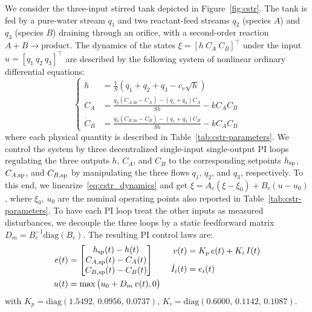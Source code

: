 \documentclass[11pt, a4paper]{article}
\theoremstyle{remark}
\theoremstyle{plain}
\begin{document}
We consider the three-input stirred tank depicted in Figure~\ref{fig:cstr}. The tank is fed by a pure-water stream $q_1$ and two reactant-feed streams $q_2$ (species $A$) and $q_3$ (species $B$) draining through 
an orifice, with a second-order reaction $A+B\to\text{product}$. 
The dynamics of the states $\xi=[h\ C_A\ C_B]^\top$ 
under the input $u=[q_1\ q_2\ q_3]^\top$ are described by the following system of nonlinear 
ordinary differential equations:
\begin{equation}
\left\{
\begin{aligned}
\dot h &= \frac{1}{S}(q_1 + q_2 + q_3 - c_v\sqrt{h}) \\
\dot C_A &= \frac{q_2(C_{A,\mathrm{in}}-C_A) - (q_1+q_3)C_A}{S h} - k C_A C_B \\
\dot C_B &= \frac{q_3(C_{B,\mathrm{in}}-C_B) - (q_1+q_2)C_B}{S h} - k C_A C_B 
\end{aligned}
\right.
\label{eq:cstr_dynamics}%
\end{equation}
where each physical quantity is described in Table~\ref{tab:cstr-parameters}. We control the system by three decentralized single-input single-output PI loops regulating the three outputs $h$, $C_A$, and $C_B$ to the corresponding setpoints $h_{\rm sp}$, $C_{A,\rm sp}$, and $C_{B,\rm sp}$ by manipulating the three flows $q_1$, $q_2$, and $q_3$,
respectively. To this end, we linearize~\eqref{eq:cstr_dynamics} and get $\dot\xi = A_c (\xi-\xi_0) + B_c (u-u_0)$, where $\xi_0$, $u_0$ are the nominal operating points also reported in Table~\ref{tab:cstr-parameters}. To have each PI loop treat the other inputs as measured disturbances, we decouple the three loops by a static feedforward matrix $D_m = B_c^{-1}\mathrm{diag}(B_c)$. The resulting PI control laws are:
\begin{subequations}
\begin{align}
e(t) &= \begin{bmatrix} h_{\rm sp}(t)-h(t)\\ C_{A,\rm sp}(t)-C_A(t)\\ C_{B,\rm sp}(t)-C_B(t)\end{bmatrix} \qquad
\begin{aligned}
v(t) &= K_p\,e(t) + K_i\,I(t)\\[.5em]
\dot I_i(t)&=e_i(t) \label{eq:pi-law}
\end{aligned}\\
u(t) &= \max\big(u_0 + D_m\,v(t), 0\big) \label{eq:pi-decoupling}
\end{align}%
\label{eq:pi-controller}%
\end{subequations}
with $K_p=\mathrm{diag}(1.5492,\,0.0956,\,0.0737)$, $K_i=\mathrm{diag}(0.6000,\,0.1142,\,0.1087)$.
\end{document}

